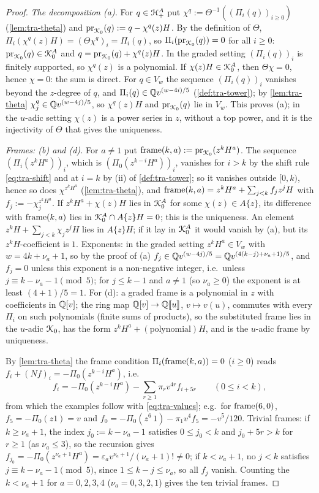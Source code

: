 \begin{proof}
\emph{The decomposition (a).} For $q\in\mathcal{H}^A_+$ put $\chi^q := \Theta^{-1}((\Pi_i(q))_{i\geq 0})$ (\cref{lem:tra-theta}) and $\mathrm{pr}_{\mathcal{K}_{0}}(q) := q-\chi^q(z)H$. By the definition of $\Theta$, $\Pi_i(\chi^q(z)H) = (\Theta\chi^q)_i = \Pi_i(q)$, so $\Pi_i(\mathrm{pr}_{\mathcal{K}_{0}}(q)) = 0$ for all $i\geq 0$: $\mathrm{pr}_{\mathcal{K}_{0}}(q)\in\mathcal{K}_{0}^A$ and $q = \mathrm{pr}_{\mathcal{K}_{0}}(q)+\chi^q(z)H$. In the graded setting $(\Pi_i(q))_i$ is finitely supported, so $\chi^q(z)$ is a polynomial. If $\chi(z)H\in\mathcal{K}_{0}^A$, then $\Theta\chi = 0$, hence $\chi = 0$: the sum is direct. For $q\in V_w$ the sequence $(\Pi_i(q))_i$ vanishes beyond the $z$-degree of $q$, and $\Pi_i(q)\in\mathbb{Q} v^{(w-4i)/5}$ (\cref{def:tra-tower}); by \cref{lem:tra-theta} $\chi^q_j\in\mathbb{Q} v^{(w-4j)/5}$, so $\chi^q(z)H$ and $\mathrm{pr}_{\mathcal{K}_{0}}(q)$ lie in $V_w$. This proves (a); in the $u$-adic setting $\chi(z)$ is a power series in $z$, without a top power, and it is the injectivity of $\Theta$ that gives the uniqueness.

\emph{Frames: (b) and (d).} For $a\neq 1$ put $\mathrm{frame}(k,a) := \mathrm{pr}_{\mathcal{K}_{0}}(z^kH^a)$. The sequence $(\Pi_i(z^kH^a))_i$, which is $(\Pi_0(z^{k-i}H^a))_i$, vanishes for $i>k$ by the shift rule \eqref{eq:tra-shift} and at $i = k$ by (ii) of \cref{def:tra-tower}; so it vanishes outside $[0,k)$, hence so does $\chi^{z^kH^a}$ (\cref{lem:tra-theta}), and $\mathrm{frame}(k,a) = z^kH^a+\sum_{j<k}f_jz^jH$ with $f_j := -\chi^{z^kH^a}_j$. If $z^kH^a+\chi(z)H$ lies in $\mathcal{K}_{0}^A$ for some $\chi(z)\in A\{z\}$, its difference with $\mathrm{frame}(k,a)$ lies in $\mathcal{K}_{0}^A\cap A\{z\}H = 0$; this is the uniqueness. An element $z^kH+\sum_{j<k}\chi_jz^jH$ lies in $A\{z\}H$; if it lay in $\mathcal{K}_{0}^A$ it would vanish by (a), but its $z^kH$-coefficient is $1$. Exponents: in the graded setting $z^kH^a\in V_w$ with $w = 4k+\nu_a+1$, so by the proof of (a) $f_j\in\mathbb{Q} v^{(w-4j)/5} = \mathbb{Q} v^{(4(k-j)+\nu_a+1)/5}$, and $f_j = 0$ unless this exponent is a non-negative integer, i.e.\ unless $j\equiv k-\nu_a-1\pmod 5$; for $j\leq k-1$ and $a\neq 1$ (so $\nu_a\geq 0$) the exponent is at least $(4+1)/5 = 1$. For (d): a graded frame is a polynomial in $z$ with coefficients in $\mathbb{Q}[v]$; the ring map $\mathbb{Q}[v]\to\mathbb{Q}[\![ u ]\!]$, $v\mapsto v(u)$, commutes with every $\Pi_i$ on such polynomials (finite sums of products), so the substituted frame lies in the $u$-adic $\mathcal{K}_{0}$, has the form $z^kH^a+(\text{polynomial})H$, and is the $u$-adic frame by uniqueness.

By \cref{lem:tra-theta} the frame condition $\Pi_i(\mathrm{frame}(k,a)) = 0$ ($i\geq 0$) reads $f_i+(Nf)_i = -\Pi_0(z^{k-i}H^a)$, i.e.
\[
f_i = -\Pi_0(z^{k-i}H^a)-\sum_{r\geq 1}\pi_rv^{4r}f_{i+5r}\qquad(0\leq i<k),
\]
from which the examples follow with \eqref{eq:tra-values}; e.g.\ for $\mathrm{frame}(6,0)$, $f_5 = -\Pi_0(z1) = v$ and $f_0 = -\Pi_0(z^6\,1)-\pi_1v^4f_5 = -v^5/120$. Trivial frames: if $k\geq\nu_a+1$, the index $j_0 := k-\nu_a-1$ satisfies $0\leq j_0<k$ and $j_0+5r>k$ for $r\geq 1$ (as $\nu_a\leq 3$), so the recursion gives $f_{j_0} = -\Pi_0(z^{\nu_a+1}H^a) = \varepsilon_av^{\nu_a+1}/(\nu_a+1)!\neq 0$; if $k<\nu_a+1$, no $j<k$ satisfies $j\equiv k-\nu_a-1\pmod 5$, since $1\leq k-j\leq\nu_a$, so all $f_j$ vanish. Counting the $k<\nu_a+1$ for $a = 0,2,3,4$ ($\nu_a = 0,3,2,1$) gives the ten trivial frames.


\end{proof}
